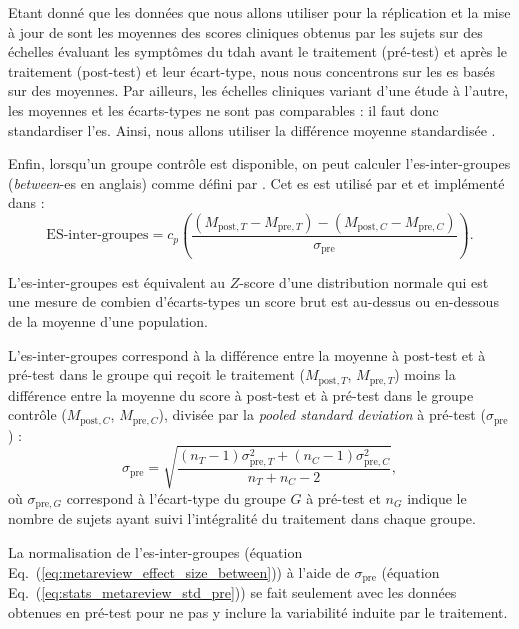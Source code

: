Etant donné que les données que nous allons utiliser pour la réplication et la mise à jour de \citet{Cortese2016} sont les moyennes des 
scores cliniques obtenus par les sujets sur des échelles évaluant les symptômes du \gls{tdah} avant le traitement (pré-test) et 
après le traitement (post-test) et leur écart-type, nous nous concentrons sur 
les \gls{es} basés sur des moyennes. Par ailleurs, les échelles cliniques variant 
d'une étude à l'autre, les moyennes et les écarts-types ne sont pas comparables : il faut donc standardiser l'\gls{es}. 
Ainsi, nous allons utiliser la différence moyenne standardisée \citep{Cortese2016, Micoulaud2014}.

Enfin, lorsqu'un groupe contrôle est disponible, on peut calculer l'\gls{es}-inter-groupes (\textit{between}-\gls{es} en anglais) comme défini par \citet{Morris2008}.
Cet \gls{es} est utilisé par \citet{Cortese2016} et \citet{Micoulaud2014} et implémenté dans \citet{Bussalb2019clinical} :
\begin{equation}
\label{eq:metareview_effect_size_between}
\text{ES-inter-groupes} = c_p \left(\frac{(M_{\text{post},T} - M_{\text{pre},T}) - (M_{\text{post},C} - M_{\text{pre},C}) }{\sigma_{\text{pre}}} \right).
\end{equation} 

L'\gls{es}-inter-groupes est équivalent au $Z$-score d'une distribution normale qui est une mesure de combien d'écarts-types un score brut est au-dessus ou en-dessous
de la moyenne d'une population. 

L'\gls{es}-inter-groupes correspond à la différence entre la moyenne à post-test et à pré-test 
dans le groupe qui reçoit le traitement ($M_{\text{post},T}$, $M_{\text{pre},T}$) moins la différence entre la moyenne du score à post-test et à pré-test 
dans le groupe contrôle ($M_{\text{post},C}$, $M_{\text{pre},C}$), divisée par la \textit{pooled standard deviation} à pré-test ($\sigma_{\text{pre}}$) :
\begin{equation}
\label{eq:stats_metareview_std_pre}
\sigma_{\text{pre}} = \sqrt{\frac{(n_T - 1)\sigma_{\text{pre},T}^2 + (n_C - 1)\sigma_{\text{pre},C}^2} {n_T + n_C - 2}},
\end{equation}
où $\sigma_{\text{pre},G}$ correspond à l'écart-type du groupe $G$ à pré-test et $n_G$ indique le nombre de sujets ayant suivi l'intégralité 
du traitement dans chaque groupe.

La normalisation de l'\gls{es}-inter-groupes (équation Eq.~(\ref{eq:metareview_effect_size_between})) à l'aide de $\sigma_{\text{pre}}$ 
(équation Eq.~(\ref{eq:stats_metareview_std_pre})) se fait seulement avec les données obtenues en pré-test pour ne pas y inclure la variabilité 
induite par le traitement.

